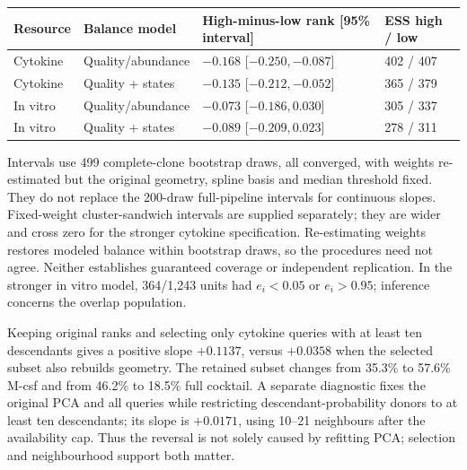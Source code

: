 \documentclass[a4paper,fleqn]{cas-sc}
\makeatletter
\DeclareRobustCommand{\rev}[1]{{\color{red}\def\@citecolor{black}\def\@linkcolor{red}\def\@urlcolor{red}#1}}
\makeatother
\begin{document}
\begin{longtable}{p{}p{}p{}p{}}
\toprule
\rev{Resource} & \rev{Balance model} & \rev{High-minus-low rank [95\% interval]} & \rev{ESS high / low}\\
\midrule
\endhead
\rev{Cytokine} & \rev{Quality/abundance} & \rev{$-0.168$ [$-0.250,-0.087$]} & \rev{402 / 407}\\
\rev{Cytokine} & \rev{Quality + states} & \rev{$-0.135$ [$-0.212,-0.052$]} & \rev{365 / 379}\\
\rev{In vitro} & \rev{Quality/abundance} & \rev{$-0.073$ [$-0.186,0.030$]} & \rev{305 / 337}\\
\rev{In vitro} & \rev{Quality + states} & \rev{$-0.089$ [$-0.209,0.023$]} & \rev{278 / 311}\\
\bottomrule
\end{longtable}
Intervals use 499 complete-clone bootstrap draws, all converged, with weights re-estimated but the original geometry, spline basis and median threshold fixed. They do not replace the 200-draw full-pipeline intervals for continuous slopes. Fixed-weight cluster-sandwich intervals are supplied separately; they are wider and cross zero for the stronger cytokine specification. Re-estimating weights restores modeled balance within bootstrap draws, so the procedures need not agree. Neither establishes guaranteed coverage or independent replication. In the stronger in vitro model, 364/1,243 units had $e_i<0.05$ or $e_i>0.95$; inference concerns the overlap population.

Keeping original ranks and selecting only cytokine queries with at least ten descendants gives a positive slope $+0.1137$, versus $+0.0358$ when the selected subset also rebuilds geometry. The retained subset changes from 35.3\% to 57.6\% M-csf and from 46.2\% to 18.5\% full cocktail. A separate diagnostic fixes the original PCA and all queries while restricting descendant-probability donors to at least ten descendants; its slope is $+0.0171$, using 10--21 neighbours after the availability cap. Thus the reversal is not solely caused by refitting PCA; selection and neighbourhood support both matter.
\end{document}
